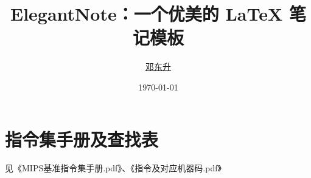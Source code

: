 \documentclass[cn,blue,normal,11pt]{elegantnote}
\title{ElegantNote：一个优美的 \LaTeX{} 笔记模板}
\author{\href{https://ddswhu.me/}{邓东升}}
\institute{\href{https://elegantlatex.org/}{Elegant\LaTeX{} Program}}
\date{\today}
\begin{document}



\newpage



\newpage




% 


% 
\newpage
\appendix
\section{指令集手册及查找表}
见《MIPS基准指令集手册.pdf》、《指令及对应机器码.pdf》



\end{document}
